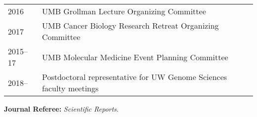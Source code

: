 \documentclass{article}
\newcommand{\mysection}[1]{\vspace{1ex}{\bf #1}}
\begin{document}
\mysection{Professional Service}

\begin{tabular}{p{0.5in}p{5.75in}}
  2016       & UMB Grollman Lecture Organizing Committee \\
  2017       & UMB Cancer Biology Research Retreat Organizing Committee \\
  2015--17   & UMB Molecular Medicine Event Planning Committee \\
  2018--     & Postdoctoral representative for UW Genome Sciences faculty meetings\\ 
\end{tabular}

{\bf Journal Referee: }{\em Scientific Reports}.
\end{document}
